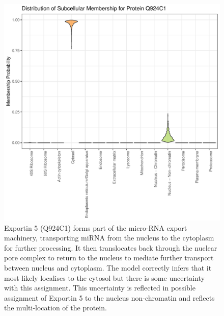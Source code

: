 \documentclass{beamer}
\theoremstyle{example}
\newcommand{\sidebysidecaption}[4]{%
\RaggedRight%
  \begin{minipage}[t]{#1}
    \vspace*{0pt}
    #3
  \end{minipage}
  \hfill%
  \begin{minipage}[t]{#2}
    \vspace*{0pt}
    #4
\end{minipage}%
}
\begin{document}
\begin{frame}
  \begin{figure}
    \centering
    \sidebysidecaption{0.55\linewidth}{0.42\linewidth}{
      \includegraphics[width=1\linewidth]{./figs/Q924C1-prob-1.pdf}
    }{
    \caption{\scriptsize \justifying Exportin 5 (Q924C1) forms part of
      the micro-RNA export machinery, transporting miRNA from the
      nucleus to the cytoplasm for further processing.  It then
      translocates back through the nuclear pore complex to return to
      the nucleus to mediate further transport between nucleus and
      cytoplasm. The model correctly infers that it most likely
      localises to the cytosol but there is some uncertainty with this
      assignment. This uncertainty is reflected in possible assignment
      of Exportin 5 to the nucleus non-chromatin and reflects the
      multi-location of the protein.}  }

  \end{figure}
\end{frame}
\end{document}
